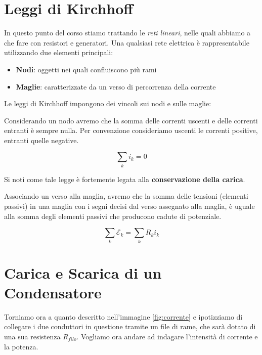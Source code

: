 \section{Leggi di Kirchhoff}
In questo punto del corso stiamo trattando le \textit{reti lineari}, nelle quali abbiamo a che fare con resistori e generatori. Una qualsiasi rete elettrica è rappresentabile utilizzando due elementi principali: 

\begin{itemize}
	\item \textbf{Nodi}: oggetti nei quali confluiscono più rami
	\item \textbf{Maglie}: caratterizzate da un verso di percorrenza della corrente 
\end{itemize}

Le leggi di Kirchhoff impongono dei vincoli sui nodi e sulle maglie: 

\begin{tcolorbox}[ title=1° Legge di Kirchhoff]
	Considerando un nodo avremo che la somma delle correnti uscenti e delle correnti entranti è sempre nulla. Per convenzione consideriamo uscenti le correnti positive, entranti quelle negative.
	\begin{large}
		\begin{equation}
			\sum_k i_k = 0
		\end{equation}
	\end{large}
\end{tcolorbox}

Si noti come tale legge è fortemente legata alla \textbf{conservazione della carica}.

\begin{tcolorbox}[ title=2° Legge di Kirchhoff]
	Associando un verso alla maglia, avremo che la somma delle tensioni (elementi passivi) in una maglia con i segni decisi dal verso assegnato alla maglia, è uguale alla somma degli elementi passivi che producono cadute di potenziale.
	\begin{large}
		\begin{equation}
			\sum_k \mathcal{E}_k = \sum_k R_k i_k
		\end{equation}
	\end{large}
\end{tcolorbox}

\section{Carica e Scarica di un Condensatore}
Torniamo ora a quanto descritto nell'immagine \ref{fig:corrente} e ipotizziamo di collegare i due conduttori in questione tramite un file di rame, che sarà dotato di una sua resistenza $R_{filo}$. Vogliamo ora andare ad indagare l'intensità di corrente e la potenza. 

